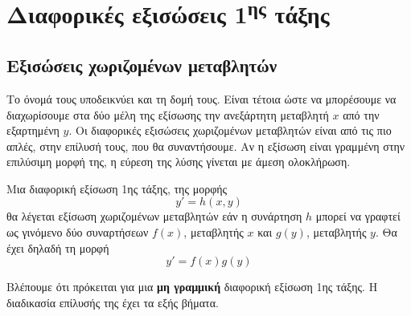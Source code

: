 \documentclass[11pt,a4paper,twoside]{book}
\newcommand{\titlefont}[1]{{\fontfamily{maksf}\selectfont #1}}
\newcounter{orismos}[chapter]
\renewcommand{\theorismos}{\thechapter.\arabic{orismos}}
\newcommand{\orism}{\refstepcounter{orismos}{\bf\titlefont{\textcolor{maincolor}{\large{Ορισμός}\hspace{2mm}\theorismos}}}\hspace{1mm}}{}
\newenvironment{Orismos}[1]
{\begin{tcolorbox}[title=\orism:\ \  {\bf{\large\titlefont{#1}}},
breakable,
enhanced standard,
titlerule=-.2pt,
toprule=0pt, 
rightrule=0pt, 
bottomrule=0pt,
colback=white,
opacityfill=0,
left=2mm,
top=1mm,
bottom=0mm,
boxrule=0pt,
colframe=white,
borderline west={1.5mm}{0pt}{maincolor},
leftrule=2mm,
sharp corners,
coltitle=black]}
{\end{tcolorbox}}
\newcommand{\tss}[1]{\textsuperscript{#1}}
\begin{document}
\chapter{Διαφορικές εξισώσεις 1\tss{ης} τάξης}
\section{Εξισώσεις χωριζομένων μεταβλητών}
Το όνομά τους υποδεικνύει και τη δομή τους. Είναι τέτοια ώστε να μπορέσουμε να διαχωρίσουμε στα δύο μέλη της εξίσωσης την ανεξάρτητη μεταβλητή $x$ από την εξαρτημένη $y$. Οι διαφορικές εξισώσεις χωριζομένων μεταβλητών είναι από τις πιο απλές, στην επίλυσή τους, που θα συναντήσουμε. Αν η εξίσωση είναι γραμμένη στην επιλύσιμη μορφή της, η εύρεση της λύσης γίνεται με άμεση ολοκλήρωση.
\begin{Orismos}{Εξίσωση χωριζομένων μεταβλητών}
Μια διαφορική εξίσωση 1ης τάξης, της μορφής
\[ y'=h(x,y) \]
θα λέγεται εξίσωση χωριζομένων μεταβλητών εάν η συνάρτηση $h$ μπορεί να γραφτεί ως γινόμενο δύο συναρτήσεων $f(x)$, μεταβλητής $x$ και $g(y)$, μεταβλητής $y$. Θα έχει δηλαδή τη μορφή
\begin{equation}\label{eq:sepvar:1}
y'=f(x)g(y)
\end{equation}
\end{Orismos}
Βλέπουμε ότι πρόκειται για μια \textbf{μη γραμμική} διαφορική εξίσωση 1ης τάξης. Η διαδικασία επίλυσής της έχει τα εξής βήματα. 
\end{document}
